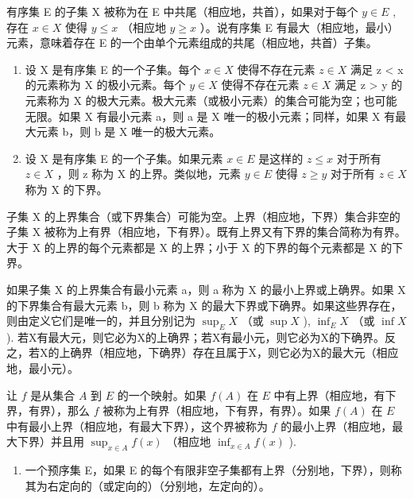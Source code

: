 有序集 E 的子集 X 被称为在 E 中共尾（相应地，共首），如果对于每个 \(y \in E\) , 存在 \(x \in X\) 使得 \(y \leqslant x\) （相应地 \(y \geqslant x\) ）。说有序集 E 有最大（相应地，最小）元素，意味着存在 E 的一个由单个元素组成的共尾（相应地，共首）子集。

\begin{enumerate}
\def\labelenumi{\arabic{enumi}.}
\setcounter{enumi}{5}
\item
  设 X 是有序集 E 的一个子集。每个 \(x \in X\) 使得不存在元素 \(z \in X\) 满足 z \textless{} x 的元素称为 X 的极小元素。每个 \(y \in X\) 使得不存在元素 \(z \in X\) 满足 z \textgreater{} y 的元素称为 X 的极大元素。极大元素（或极小元素）的集合可能为空；也可能无限。如果 X 有最小元素 a，则 a 是 X 唯一的极小元素；同样，如果 X 有最大元素 b，则 b 是 X 唯一的极大元素。
\item
  设 X 是有序集 E 的一个子集。如果元素 \(x \in E\) 是这样的 \(z \leqslant x\) 对于所有 \(z \in X\) ，则 z 称为 X 的上界。类似地，元素 \(y \in E\) 使得 \(z \geqslant y\) 对于所有 \(z \in X\) 称为 X 的下界。
\end{enumerate}

子集 X 的上界集合（或下界集合）可能为空。上界（相应地，下界）集合非空的子集 X 被称为上有界（相应地，下有界）。既有上界又有下界的集合简称为有界。大于 X 的上界的每个元素都是 X 的上界；小于 X 的下界的每个元素都是 X 的下界。

如果子集 X 的上界集合有最小元素 a，则 a 称为 X 的最小上界或上确界。如果 X 的下界集合有最大元素 b，则 b 称为 X 的最大下界或下确界。如果这些界存在，则由定义它们是唯一的，并且分别记为 \(\sup_{E} X\) （或 \(\sup X\) ), \(\inf_{E} X\) （或 \(\inf X\) ). 若X有最大元，则它必为X的上确界；若X有最小元，则它必为X的下确界。反之，若X的上确界（相应地，下确界）存在且属于X，则它必为X的最大元（相应地，最小元）。

让 \(f\) 是从集合 \(A\) 到 \(E\) 的一个映射。如果 \(f(A)\) 在 \(E\) 中有上界（相应地，有下界，有界），那么 \(f\) 被称为上有界（相应地，下有界，有界）。如果 \(f(A)\) 在 \(E\) 中有最小上界（相应地，有最大下界），这个界被称为 \(f\) 的最小上界（相应地，最大下界）并且用 \(\sup_{x \in A} f(x)\) （相应地 \(\inf_{x \in A} f(x)\) ).

\begin{enumerate}
\def\labelenumi{\arabic{enumi}.}
\setcounter{enumi}{7}
\tightlist
\item
  一个预序集 E，如果 E 的每个有限非空子集都有上界（分别地，下界），则称其为右定向的（或定向的）（分别地，左定向的）。
\end{enumerate}

